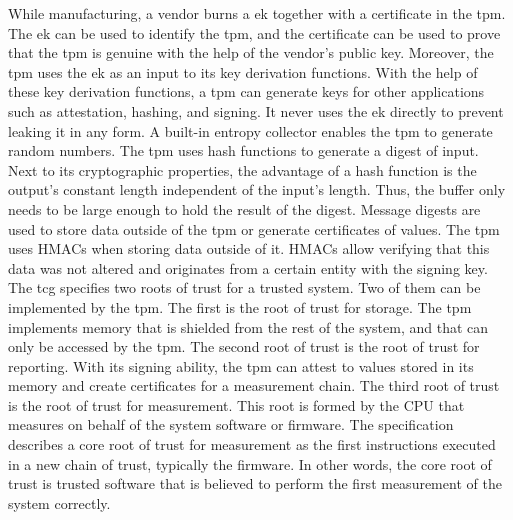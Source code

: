 While manufacturing, a vendor burns a \gls{ek} together with a certificate in
the \gls{tpm}. The \gls{ek} can be used to identify the \gls{tpm}, and the
certificate can be used to prove that the \gls{tpm} is genuine with the help of
the vendor's public key. Moreover, the \gls{tpm} uses the \gls{ek} as an input
to its key derivation functions. With the help of these key derivation
functions, a \gls{tpm} can generate keys for other applications such as
attestation, hashing, and signing. It never uses the \gls{ek} directly to
prevent leaking it in any form. A built-in entropy collector enables the
\gls{tpm} to generate random numbers. The \gls{tpm} uses hash functions to
generate a digest of input. Next to its cryptographic properties, the advantage
of a hash function is the output's constant length independent of the input's
length. Thus, the buffer only needs to be large enough to hold the result of the
digest. Message digests are used to store data outside of the \gls{tpm} or
generate certificates of values. The \gls{tpm} uses HMACs when storing data
outside of it. HMACs allow verifying that this data was not altered and
originates from a certain entity with the signing key.\\

The \gls{tcg} specifies two roots of trust for a trusted system. Two of them can
be implemented by the \gls{tpm}. The first is the root of trust for storage. The
\gls{tpm} implements memory that is shielded from the rest of the system, and
that can only be accessed by the \gls{tpm}. The second root of trust is the root
of trust for reporting. With its signing ability, the \gls{tpm} can attest to
values stored in its memory and create certificates for a measurement chain. The
third root of trust is the root of trust for measurement. This root is formed by
the CPU that measures on behalf of the system software or firmware. The
specification describes a core root of trust for measurement as the first
instructions executed in a new chain of trust, typically the firmware. In other
words, the core root of trust is trusted software that is believed to perform
the first measurement of the system correctly.\\

